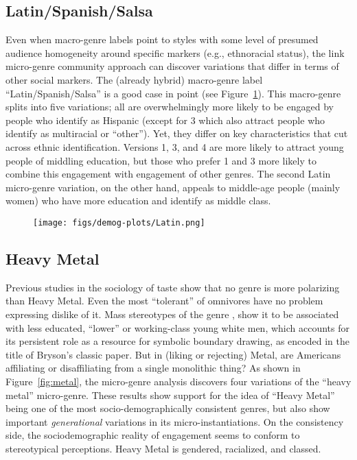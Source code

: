 \subsection{Latin/Spanish/Salsa}
Even when macro-genre labels point to styles with some level of presumed audience homogeneity around specific markers (e.g., ethnoracial status), the link micro-genre community approach can discover variations that differ in terms of other social markers. The (already hybrid) macro-genre label ``Latin/Spanish/Salsa'' is a good case in point (see Figure~\ref{fig:latin}). This macro-genre splits into five variations; all are overwhelmingly more likely to be engaged by people who identify as Hispanic (except for 3 which also attract people who identify as multiracial or ``other''). Yet, they differ on key characteristics that cut across ethnic identification. Versions 1, 3, and 4 are more likely to attract young people of middling education, but those who prefer 1 and 3 more likely to combine this engagement with engagement of other genres. The second Latin micro-genre variation, on the other hand, appeals to middle-age people (mainly women) who have more education and identify as middle class. 

 \begin{figure}[ht!]
 \centering
 \texttt{[image: figs/demog-plots/Latin.png]}
 \caption{}
  \label{fig:latin}
 \end{figure}
 
 \subsection{Heavy Metal}
Previous studies in the sociology of taste show that no genre is more polarizing than Heavy Metal. Even the most ``tolerant'' of omnivores have no problem expressing dislike of it. Mass stereotypes of the genre \citep{lizardo_skiles16}, show it to be associated with less educated, ``lower'' or working-class young white men, which accounts for its persistent role as a resource for symbolic boundary drawing, as encoded in the title of Bryson's \citeyearpar{bryson96} classic paper. But in (liking or rejecting) Metal, are Americans affiliating or disaffiliating from a single monolithic thing? As shown in Figure~\ref{fig:metal}, the micro-genre analysis discovers four variations of the ``heavy metal'' micro-genre. These results show support for the idea of ``Heavy Metal'' being one of the most socio-demographically consistent genres, but also show important \textit{generational} variations in its micro-instantiations. On the consistency side, the sociodemographic reality of engagement seems to conform to stereotypical perceptions. Heavy Metal is gendered, racialized, and classed. 

